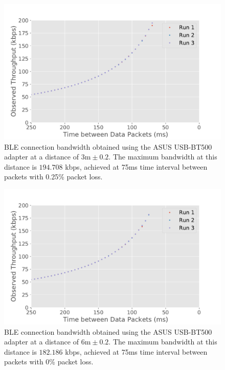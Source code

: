 \begin{figure}[H]
    \centering
    \includegraphics[width=0.75\linewidth]{images/ble-bandwidth-hci0-300cm.pdf}
    \caption[\acs{BLE} connection bandwidth obtained using the ASUS USB-BT500 adapter at a distance of 3m.]{\acs{BLE} connection bandwidth obtained using the ASUS USB-BT500 adapter at a distance of $3\text{m} \pm 0.2$. The maximum bandwidth at this distance is $194.708$ kbps, achieved at 75ms time interval between packets with 0.25\% packet loss.}
    \label{fig:ble-bandwidth-hci0-3m}
\end{figure}

\begin{figure}[H]
    \centering
    \includegraphics[width=0.75\linewidth]{images/ble-bandwidth-hci0-600cm.pdf}
    \caption[\acs{BLE} connection bandwidth obtained using the ASUS USB-BT500 adapter at a distance of 6m.]{\acs{BLE} connection bandwidth obtained using the ASUS USB-BT500 adapter at a distance of $6\text{m} \pm 0.2$. The maximum bandwidth at this distance is $182.186$ kbps, achieved at 75ms time interval between packets with 0\% packet loss.}
    \label{fig:ble-bandwidth-hci0-6m}
\end{figure}

